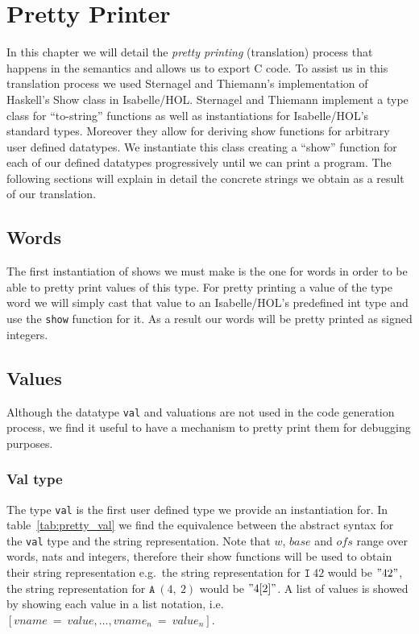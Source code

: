 \chapter{Pretty Printer}\label{chapter:pretty}

In this chapter we will detail the \textit{pretty printing} (translation) process that happens in the semantics and allows us to export C code.
To assist us in this translation process we used Sternagel and Thiemann's implementation of Haskell's Show class in Isabelle/HOL\cite{Show-AFP}.
Sternagel and Thiemann implement a type class for ``to-string'' functions as well as instantiations for Isabelle/HOL's standard types.
Moreover they allow for deriving show functions for arbitrary user defined datatypes.
We instantiate this class creating a ``show'' function for each of our defined datatypes progressively until we can print a program.
The following sections will explain in detail the concrete strings we obtain as a result of our translation.

\section{Words}\label{section:pretty_words}
The first instantiation of shows we must make is the one for words in order to be able to pretty print values of this type.
For pretty printing a value of the type word we will simply cast that value to an Isabelle/HOL's predefined int type and use the \verb|show| function for it.
As a result our words will be pretty printed as signed integers.

\section{Values}\label{section:pretty_values}

Although the datatype \verb|val| and valuations are not used in the code generation process, we find it useful to have a mechanism to pretty print them for debugging purposes.

\subsection{Val type}\label{subsection:pretty_val_type}
The type \verb|val| is the first user defined type we provide an instantiation for.
In table~\ref{tab:pretty_val} we find the equivalence between the abstract syntax for the \verb|val| type and the string representation.
Note that $w$, $base$ and $ofs$ range over words, nats and integers, therefore their show functions will be used to obtain their string representation e.g.\ the string representation for $\mathtt{I}\ 42$ would be $"42"$, the string representation for $\mathtt{A}\ (4,\ 2)$ would be $"4[2]"$.
A list of values is showed by showing each value in a list notation, i.e.\ $[vname\ =\ value, \dots, vname_n\ =\ value_n]$.

